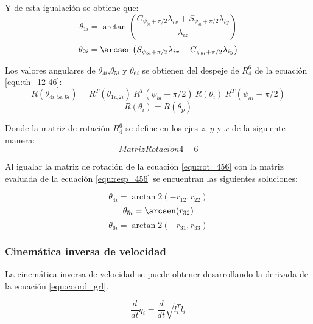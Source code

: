 \documentclass[letterpaper, 12pt]{article}
\begin{document}
Y de esta igualación se obtiene que:
\begin{equation}
\theta_{1i} = \arctan\left(\frac{C_{\psi_{bi}+\pi/2} \lambda_{ix} + S_{\psi_{bi}+\pi/2} \lambda_{iy}}{\lambda_{iz}}\right)
\end{equation}
\begin{equation}
\theta_{2i} = \arcsen\left(S_{\psi_{bi}+\pi/2} \lambda_{ix} - C_{\psi_{bi}+\pi/2} \lambda_{iy}\right)
\end{equation}

Los valores angulares de $\theta_{4i}$,$\theta_{5i}$ y $\theta_{6i}$ se obtienen del despeje de $R_4^6$ de la ecuación \ref{equ:th_12-46}:
\begin{equation}\label{equ:resp_456}
R(\theta_{4i,5i,6i})= R^T(\theta_{1i,2i})\ R^T(\psi_{bi}+\pi/2)\ R(\theta_i)\ R^T(\psi_{ai}-\pi/2)
\end{equation}
\begin{equation*}
R(\theta_i) = R(\theta_p)
\end{equation*}

Donde la matriz de rotación $R_4^6$ se define en los ejes $z$, $y$ y $x$ de la siguiente manera:
\begin{equation}\label{equ:rot_456}
Matriz Rotacion 4-6
\end{equation}

Al igualar la matriz de rotación de la ecuación \ref{equ:rot_456} con la matriz evaluada de la ecuación \ref{equ:resp_456} se encuentran las siguientes soluciones:

\begin{equation}
\theta_{4i} = \arctan2 (-r_{12},r_{22})
\end{equation}
\begin{equation}
\theta_{5i} = \arcsen (r_{32})
\end{equation}
\begin{equation}
\theta_{6i} = \arctan2 (-r_{31},r_{33})
\end{equation}

\subsubsection{Cinemática inversa de velocidad}
La cinemática inversa de velocidad se puede obtener desarrollando la derivada de la ecuación \ref{equ:coord_grl}.

\begin{equation}
\frac{d}{dt}q_i = \frac{d}{dt}\sqrt{l_i^Tl_i} 
\end{equation}
\end{document}
